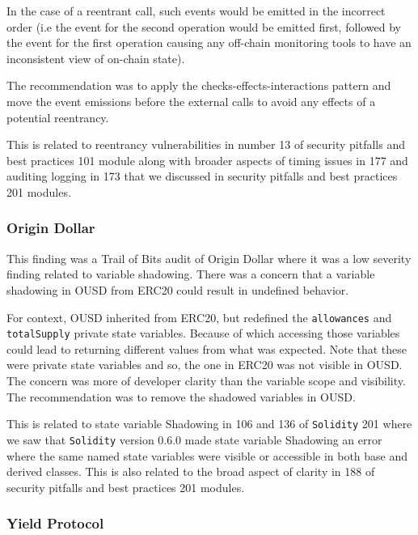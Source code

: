 In the case of a reentrant call, such events would be emitted in the
incorrect order (i.e the event for the second operation would be emitted
first, followed by the event for the first operation causing any
off-chain monitoring tools to have an inconsistent view of on-chain
state).

The recommendation was to apply the checks-effects-interactions pattern
and move the event emissions before the external calls to avoid any
effects of a potential reentrancy.

This is related to reentrancy vulnerabilities in number 13 of security
pitfalls and best practices 101 module along with broader aspects of
timing issues in 177 and auditing logging in 173 that we discussed in
security pitfalls and best practices 201 modules.

\subsubsection{Origin Dollar}\label{origin-dollar}

This finding was a Trail of Bits audit of Origin Dollar where it was a
low severity finding related to variable shadowing. There was a concern
that a variable shadowing in OUSD from ERC20 could result in undefined
behavior.

For context, OUSD inherited from ERC20, but redefined the
\texttt{allowances} and \texttt{totalSupply} private state variables.
Because of which accessing those variables could lead to returning
different values from what was expected. Note that these were private
state variables and so, the one in ERC20 was not visible in OUSD. The
concern was more of developer clarity than the variable scope and
visibility. The recommendation was to remove the shadowed variables in
OUSD.

This is related to state variable Shadowing in 106 and 136 of
\texttt{Solidity} 201 where we saw that \texttt{Solidity} version 0.6.0
made state variable Shadowing an error where the same named state
variables were visible or accessible in both base and derived classes.
This is also related to the broad aspect of clarity in 188 of security
pitfalls and best practices 201 modules.

\subsubsection{Yield Protocol}\label{yield-protocol}


